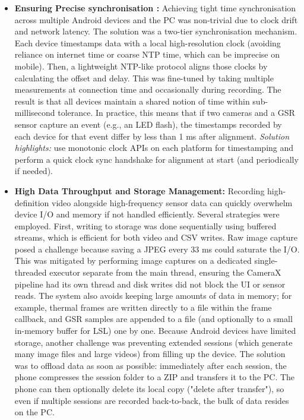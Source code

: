 \begin{itemize}
    \item \textbf{Ensuring Precise synchronisation :} Achieving tight time synchronisation across multiple Android devices and the PC was non-trivial due to clock drift and network latency. The solution was a two-tier synchronisation mechanism. Each device timestamps data with a local high-resolution clock (avoiding reliance on internet time or coarse NTP time, which can be imprecise on mobile). Then, a lightweight NTP-like protocol aligns those clocks by calculating the offset and delay. This was fine-tuned by taking multiple measurements at connection time and occasionally during recording. The result is that all devices maintain a shared notion of time within sub-millisecond tolerance. In practice, this means that if two cameras and a GSR sensor capture an event (e.g., an LED flash), the timestamps recorded by each device for that event differ by less than 1 ms after alignment. \emph{Solution highlights:} use monotonic clock APIs on each platform for timestamping and perform a quick clock sync handshake for alignment at start (and periodically if needed).
    \item \textbf{High Data Throughput and Storage Management:} Recording high-definition video alongside high-frequency sensor data can quickly overwhelm device I/O and memory if not handled efficiently. Several strategies were employed. First, writing to storage was done sequentially using buffered streams, which is efficient for both video and CSV writes. Raw image capture posed a challenge because saving a JPEG every 33 ms could saturate the I/O. This was mitigated by performing image captures on a dedicated single-threaded executor separate from the main thread, ensuring the CameraX pipeline had its own thread and disk writes did not block the UI or sensor reads. The system also avoids keeping large amounts of data in memory; for example, thermal frames are written directly to a file within the frame callback, and GSR samples are appended to a file (and optionally to a small in-memory buffer for LSL) one by one. Because Android devices have limited storage, another challenge was preventing extended sessions (which generate many image files and large videos) from filling up the device. The solution was to offload data as soon as possible: immediately after each session, the phone compresses the session folder to a ZIP and transfers it to the PC. The phone can then optionally delete its local copy ("delete after transfer"), so even if multiple sessions are recorded back-to-back, the bulk of data resides on the PC.

\end{itemize}
